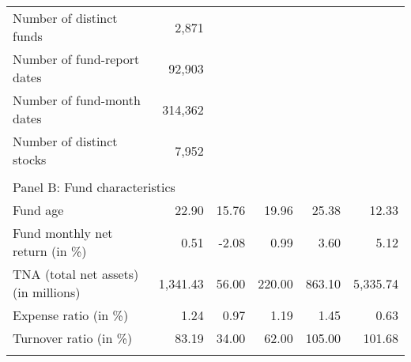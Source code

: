 \begin{singlespacing}
\begin{table}[H]
\begin{tabular}{lrrrrr}
Number of distinct funds                        & 2,871    &                                                         &          &                                                           &                                                               \\
Number of fund-report dates                     & 92,903  &                                                         &          &                                                           &                                                               \\
Number of fund-month dates                      & 314,362   &                                                         &          &                                                           &                                                               \\
Number of distinct stocks                       & 7,952    &                                                         &          &                                                           &                                                               \\
                                                &          &                                                         &          &                                                           &                                                               \\
\multicolumn{6}{l}{Panel B: Fund characteristics}                                                                                                                                                                                                           \\
Fund age                             & 22.90   & 15.76 & 19.96  & 25.38  & 12.33   \\
Fund monthly net return (in \%)      & 0.51    & -2.08 & 0.99   & 3.60   & 5.12    \\
TNA (total net assets) (in millions) & 1,341.43 & 56.00 & 220.00 & 863.10 & 5,335.74 \\
Expense ratio (in \%)                & 1.24    & 0.97  & 1.19   & 1.45   & 0.63    \\
Turnover ratio (in \%)               & 83.19   & 34.00 & 62.00  & 105.00 & 101.68                                                \\
                                                &          &                                                         &          &                                                           &                          



\end{tabular}
\end{table}
\end{singlespacing}
